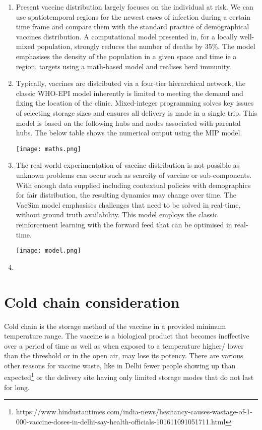 \documentclass{article}
\begin{document}
\begin{enumerate}
	\item Present vaccine distribution largely focuses on the individual at risk. We can use spatiotemporal regions for the newest cases of infection during a certain time frame and compare them with the standard practice of demographical vaccines distribution. A computational model presented in\cite{grauer2020strategic}, for a locally well-mixed population, strongly reduces the number of deaths by 35\%. The model emphasises the density of the population in a given space and time ie a region, targets using a math-based model and realises herd immunity.
	\item Typically, vaccines are distributed via a four-tier hierarchical network, the classic WHO-EPI model inherently is limited to meeting the demand and fixing the location of the clinic. Mixed-integer programming solves key issues of selecting storage sizes and ensures all delivery is made in a single trip\cite{yang2020optimizing}. This model is based on the following hubs and nodes associated with parental hubs. The below table shows the numerical output using the MIP model.
  
	\texttt{[image: maths.png]}
	\item The real-world experimentation of vaccine distribution is not possible as unknown problems can occur such as scarcity of vaccine or sub-components. With enough data supplied including contextual policies with demographics for fair distribution, the resulting dynamics may change over time. The VacSim model emphasises challenges that need to be solved in real-time, without ground truth availability. This model employs the classic reinforcement learning with the forward feed that can be optimised in real-time.\cite{awasthi2020vacsim}

\texttt{[image: model.png]}
	\item 

\end{enumerate} 
 

\section{Cold chain consideration}

Cold chain is the storage method of the vaccine in a provided minimum temperature range. The vaccine is a biological product that becomes ineffective over a period of time as well as when exposed to a temperature higher/ lower than the threshold or in the open air, may lose its potency. There are various other reasons for vaccine waste, like in Delhi fewer people showing up than expected\footnote{https://www.hindustantimes.com/india-news/hesitancy-causes-wastage-of-1-000-vaccine-doses-in-delhi-say-health-officials-101611091051711.html} or the delivery site having only limited storage modes that do not last for long.
\end{document}
